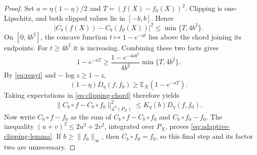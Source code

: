 \documentclass[11pt,a4paper]{article}
\theoremstyle{remark}
\newcommand{\Lcal}{\mathcal L}
\newcommand{\E}{\mathbb E}
\newcommand{\norm}[1]{\lVert#1\rVert}
\begin{document}
\begingroup
\begin{proof}
Set $a=\eta(1-\eta)/2$ and $T=(f(X)-f_0(X))^2$.
Clipping is one-Lipschitz, and both clipped values lie in $[-b,b]$.
Hence
\[
|C_b(f(X))-C_b(f_0(X))|^2\leq\min\{T,4b^2\}.
\]
On $[0,4b^2]$, the concave function $t\mapsto1-e^{-at}$ lies
above the chord joining its endpoints. For $t\geq4b^2$ it is
increasing. Combining these two facts gives
\begin{equation}\label{eq:clipping-chord}
1-e^{-aT}\geq
\frac{1-e^{-4ab^2}}{4b^2}\min\{T,4b^2\}.
\end{equation}
By \eqref{eq:renyi} and $-\log z\geq1-z$,
\[
(1-\eta)D_\eta(f,f_0)
\geq\E_X(1-e^{-aT}).
\]
Taking expectations in \eqref{eq:clipping-chord} therefore yields
\[
\norm{C_b\circ f-C_b\circ f_0}_{\Lcal^2(P_X)}^2
\leq K_\eta(b)D_\eta(f,f_0).
\]
Now write $C_b\circ f-f_0$ as the sum of
$C_b\circ f-C_b\circ f_0$ and $C_b\circ f_0-f_0$.
The inequality $(u+v)^2\leq2u^2+2v^2$, integrated over $P_X$,
proves \eqref{eq:adaptive-clipping-lemma}. If $b\geq\norm{f_0}_\infty$,
then $C_b\circ f_0=f_0$, so this final step and its factor two are
unnecessary.
\end{proof}
\endgroup
\end{document}
